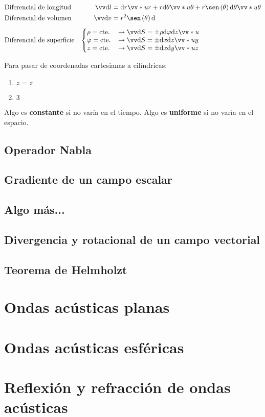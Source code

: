 \documentclass[10pt]{book}
\begin{document}
\begin{align*}
                           & \text{Diferencial de longitud}   & \vec{\dd l}  & = \dd r \vv*{u}{r} + r\dd \theta \vv*{u}{\theta} +r \sen \left( \theta \right) \dd \theta \vv*{u}{\theta} \\
                           & \text{Diferencial de volumen}    & \vec{\dd v}  & = r^2 \sen \left( \theta \right) \dd                                                                      \\[5 pt]
                           & \text{Diferencial de superficie} & \left\lbrace
  \begin{matrix*}[l]
    \rho = \text{cte.} \\
    \varphi = \text{cte.} \\
    z = \text{cte.}
  \end{matrix*} \right. &
  \begin{matrix*}[l]
    \quad \rightarrow \vec{\dd S} = \pm \rho \dd \varphi \dd z \vv*{u}{}\\
    \quad \rightarrow \vec{\dd S} = \pm \dd x \dd z \vv*{u}{y}\\
    \quad \rightarrow \vec{\dd S} = \pm \dd x \dd y \vv*{u}{z}
  \end{matrix*}                                                                                                                    \\
\end{align*}

Para pasar de coordenadas cartesianas a cilíndricas:
\begin{enumerate}
  \item $z = z$
  \item $ 3$
\end{enumerate}

Algo es \textbf{constante} si no varía en el tiempo. Algo es \textbf{uniforme} si no varía en el espacio.

\section{Operador Nabla}
\section{Gradiente de un campo escalar}
\section{Algo más...}
\section{Divergencia y rotacional de un campo vectorial}
\section{Teorema de Helmholzt}
\chapter{Ondas acústicas planas}
\chapter{Ondas acústicas esféricas}
\chapter{Reflexión y refracción de ondas acústicas}
\end{document}
